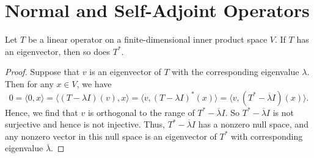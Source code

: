 \section{Normal and Self-Adjoint Operators}

\begin{lemma}
    Let \( T  \) be a linear operator on a finite-dimensional inner product space \( V  \). If \( T  \) has an eigenvector, then so does \( T^{*} \).
\end{lemma}
\begin{proof}
Suppose that \( v  \) is an eigenvector of \( T  \) with the corresponding eigenvalue \( \lambda  \). Then for any \( x \in V  \), we have
\[  0 = \langle 0  , x  \rangle =  \langle  (T - \lambda I )(v) , x   \rangle = \langle v  ,  (T - \lambda I )^{*}(x) \rangle = \langle v  ,  (T^{*} - \overline{\lambda} I)(x) \rangle. \]
Hence, we find that \( v  \) is orthogonal to the range of \( T^{*} - \overline{\lambda} I  \). So \( T^{*} - \overline{\lambda} I  \) is not surjective and hence is not injective. Thus,  \( T^{*} - \overline{\lambda}I  \) has a nonzero null space, and any nonzero vector in this null space is an eigenvector of \( T^{*} \) with corresponding eigenvalue \( \overline{\lambda} \).
\end{proof}

